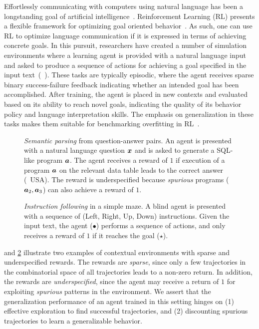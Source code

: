 Effortlessly communicating with computers using natural language has
been a longstanding goal of artificial intelligence~\cite{Winograd71}.
Reinforcement Learning (RL) presents a flexible framework for
optimizing goal oriented behavior~\cite{sutton18}. As such, one can
use RL to optimize language communication if it is expressed in terms
of achieving concrete goals.  In this pursuit, researchers have
created a number of simulation environments where a learning agent is
provided with a natural language input and asked to produce a sequence
of actions for achieving a goal specified in the input
text~(\eg~\citet{long16,hermann17,chaplot18,fu19,babyai}).  These
tasks are typically episodic, where the agent receives sparse binary
success-failure feedback indicating whether an intended goal has been
accomplished.  After training, the agent is placed in new contexts and
evaluated based on its ability to reach novel goals, indicating the quality
of its behavior policy and language interpretation skills. The
emphasis on generalization in these tasks makes them
suitable for benchmarking overfitting in
RL~\cite{cobbe2018quantifying, zhang2018study}.

\begin{figure}[t]

\caption{{\em Semantic parsing} from question-answer pairs. An agent is presented with a natural language question ${\bm{x}}$
and is asked to generate a SQL-like program ${\bm{a}}$. The agent receives
a reward of $1$ if execution of a program ${\bm{a}}$ on the relevant data
table leads to the correct answer (\eg~USA).  The reward is
underspecified because {\em spurious} programs (\eg~${\bm{a}}_2, {\bm{a}}_3$) can
also achieve a reward of $1$. }
\label{fig:fig1}
\end{figure}

\begin{figure}[t]

\caption{{\em Instruction following} in a simple maze. A blind agent is presented with
a sequence of (Left, Right, Up, Down) instructions. Given the input
text, the agent ($\bullet$) performs a sequence of actions, and only
receives a reward of $1$ if it reaches the goal ($\star$).}
\label{fig:fig2}
\vspace*{-0.15in}
\end{figure}

 and \ref{fig:fig2} illustrate two examples
of contextual environments with sparse and underspecified rewards.
The rewards are {\em sparse}, since only a few trajectories in the
combinatorial space of all trajectories leads to a non-zero return.
In addition, the rewards are {\em underspecified}, since the agent may
receive a return of $1$ for exploiting {\em spurious} patterns in the
environment.  We assert that the generalization performance of an
agent trained in this setting hinges on (1) effective exploration to
find successful trajectories, and (2) discounting spurious
trajectories to learn a generalizable behavior.

